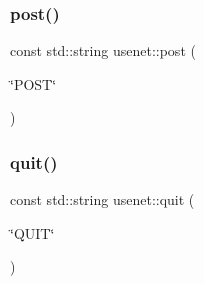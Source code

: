 \hypertarget{namespaceusenet_a7b4ed48fa7fc89cb6dbcd606e75bbabe}{}\label{namespaceusenet_a7b4ed48fa7fc89cb6dbcd606e75bbabe} 
\subsubsection{\texorpdfstring{post()}{post()}}
{\footnotesize\ttfamily const std\+::string usenet\+::post (\begin{DoxyParamCaption}\item[{\char`\"{}P\+O\+ST\char`\"{}}]{ }\end{DoxyParamCaption})}

\hypertarget{namespaceusenet_abfed272110620a286d3e908f06d62f25}{}\label{namespaceusenet_abfed272110620a286d3e908f06d62f25} 
\subsubsection{\texorpdfstring{quit()}{quit()}}
{\footnotesize\ttfamily const std\+::string usenet\+::quit (\begin{DoxyParamCaption}\item[{\char`\"{}Q\+U\+IT\char`\"{}}]{ }\end{DoxyParamCaption})}

